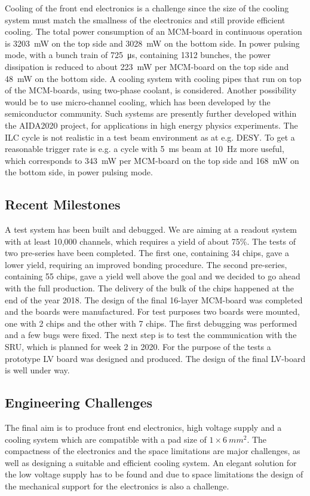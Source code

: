 Cooling of the front end electronics is a challenge since the size of the cooling system must match the smallness of the electronics and still provide efficient cooling. The total power consumption of an MCM-board in continuous operation
is \SI{3203}{mW} on the top side and \SI{3028}{mW} on the bottom side. In power pulsing mode, with a bunch train of \SI{725}{\micro s}, containing 1312 bunches, the power dissipation is reduced to about \SI{223}{mW} per MCM-board on the top side and \SI{48}{mW} on the bottom side. A cooling system with cooling pipes that run on top of the MCM-boards, using two-phase  coolant, is considered. Another possibility would be to use micro-channel cooling, which has been developed by the semiconductor community. Such systems are presently further developed within the AIDA2020 project, for applications in high energy physics experiments. The ILC cycle is not realistic in a test beam environment as at e.g. DESY. To get a reasonable trigger rate is e.g. a cycle with \SI{5}{ms} beam at \SI{10}{Hz} more useful, which corresponds to \SI{343}{mW} per MCM-board on the top side and \SI{168}{mW} on the bottom side, in power pulsing mode.

\subsection{Recent Milestones}
A test system has been built and debugged. We are aiming at a readout system with at least 10,000 channels, which requires a yield of about 75\%. The tests of two pre-series have been completed. The first one, containing 34 chips, gave a lower yield, requiring an improved bonding procedure. The second pre-series, containing 55 chips, gave a yield well above the goal and we decided to go ahead with the full production.
The delivery of the bulk of the chips happened at the end of the year 2018.
The design of the final 16-layer MCM-board was completed and the boards were manufactured.
For test purposes two boards were mounted, one with 2 chips and the other with 7 chips. The
first debugging was performed and a few bugs were fixed.
The next step is to test the communication with the SRU, which is planned for week 2 in 2020.
For the purpose of the tests a prototype LV board was designed and produced. The design of the
final LV-board is well under way.

\subsection{Engineering Challenges}
The final aim is to produce front end electronics, high voltage supply and a cooling system which are compatible with a pad size of $1 \times \SI{6}{mm^2}$. The compactness of the electronics and the space limitations are major challenges, as well as designing a suitable and efficient cooling system. An elegant solution for the low voltage supply has to be found and due to space limitations the design of the mechanical support for the electronics is also a challenge.

